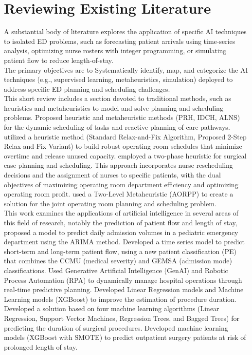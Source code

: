 \documentclass[runningheads]{llncs}
\begin{document}
\section{Reviewing Existing Literature}
A substantial body of literature explores the application of specific AI techniques to isolated ED problems, such as forecasting patient arrivals using time-series analysis, optimizing nurse rosters with integer programming, or simulating patient flow to reduce length-of-stay.\\
The primary objectives are to Systematically identify, map, and categorize the AI techniques (e.g., supervised learning, metaheuristics, simulation) deployed to address specific ED planning and scheduling challenges.\\
This short review includes a section devoted to traditional methods, such as heuristics and metaheuristics to model and solve planning and scheduling problems. \cite{mezouari2023thesis} Proposed heuristic and metaheuristic methods (PRH, IDCH, ALNS) for the dynamic scheduling of tasks and reactive planning of care pathways. \cite{kroer2018or} utilized a heuristic method (Standard Relax-and-Fix Algorithm, Proposed 2-Step Relax-and-Fix Variant) to build robust operating room schedules that minimize overtime and release unused capacity. \cite{akbarzadeh2020or}  employed a two-phase heuristic for surgical case planning and scheduling. This approach incorporates nurse rescheduling decisions and the assignment of nurses to specific patients, with the dual objectives of maximizing operating room department efficiency and optimizing operating room profit. \cite{aringhieri2015metaheuristic} used a Two-Level Metaheuristic (AORPP) to create a solution for the joint operating room planning and scheduling problem.\\
This work examines the applications of artificial intelligence in several areas of this field of research, notably the prediction of patient flow and length of stay, \cite{kadri2014ed} proposed a model to predict daily admission volumes in a pediatric emergency department using the ARIMA method. \cite{afilal2016edflow} Developed a time series model to predict short-term and long-term patient flow, using a new patient classification (PE) that combines the CCMU (medical severity) and GEMSA (admission mode) classifications. \cite{chennupati2025aira} Used Generative Artificial Intelligence (GenAI) and Robotic Process Automation (RPA) to dynamically manage hospital operations through real-time predictive planning. \cite{bartek2019ml} Developed Linear Regression models and Machine Learning models (XGBoost) to improve the estimation of procedure duration. \cite{martinez2021surgical} Developed a solution based on four machine learning algorithms (Linear Regression, Support Vector Machines, Regression Trees, and Bagged Trees) for predicting the duration of surgical procedures. \cite{jeffrey2023los} Developed machine learning models (XGBoost with SMOTE) to predict outpatient surgery patients at risk of prolonged length of stay.\\ 
\end{document}
